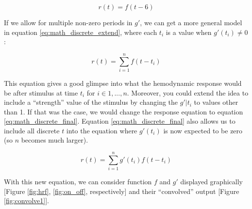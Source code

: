 \begin{equation}  \label{eq:math_discrete}
r(t)=  f(t-6)
\end{equation}



If we allow for multiple non-zero periods in $g'$, we can get a more general 
model in equation \ref{eq:math_discrete_extend}, where each $t_i$ is a value 
when $g'(t_i) \neq 0$: 

\begin{equation}  \label{eq:math_discrete_extend}
r(t)= \sum_{i=1}^n f(t-t_i)
\end{equation}

This equation gives a good glimpse into what the hemodynamic response would be 
after stimulus at time $t_i$ for $i \in {1,...,n}$. Moreover, you could extend 
the idea to include a ``strength'' value of the stimulus by changing the 
$g'|t_i$ to values other than 1. If that was the case, we would change 
the response equation to equation \ref{eq:math_discrete_final}. Equation 
\ref{eq:math_discrete_final} also allows us to include all discrete $t$ into 
the equation where $g'(t_i)$ is now expected to be zero (so $n$ becomes much 
larger). 

\begin{equation}  \label{eq:math_discrete_final}
r(t)= \sum_{i=1}^n g'(t_i) f(t-t_i)
\end{equation}


With this new equation, we can consider function $f$ and $g'$ displayed 
graphically [Figure \ref{fig:hrf}, \ref{fig:on_off}, respectively] and 
their ``convolved'' output [Figure \ref{fig:convolve1}].





